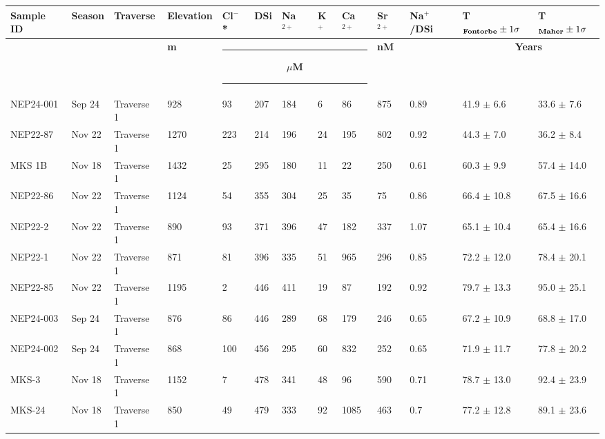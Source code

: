 \begin{landscape}
{\begin{longtable}{l l l l l l l l l l l l l}
    \hline
    \textbf{Sample ID}  &  \textbf{Season}  &  \textbf{Traverse}  &  \textbf{Elevation}  &  \textbf{Cl$^-$*}  &  \textbf{DSi}  &  \textbf{Na$^{2+}$}  &  \textbf{K$^{+}$}  &  \textbf{Ca$^{2+}$}  &  \textbf{Sr$^{2+}$}  &  \textbf{Na$^{+}$/DSi}  & \textbf{T$_{\text{\textbf{Fontorbe}}} \pm 1\sigma$ }  &  \textbf{T$_{\text{\textbf{Maher}}} \pm 1\sigma$} \\
    \hline
      &   &   &  \textbf{m}  &  \multicolumn{5}{c}{\hspace{-0.35cm}\rule{2.5cm}{0.8pt} \hspace{0.3cm}\textbf{ $\mu$M } \hspace{0.3cm} \rule{2.5cm}{0.8pt}} & \multicolumn{1}{l}{\textbf{nM}} &  &  \multicolumn{2}{c}{\textbf{Years}} \\
    \hline
    \endhead
    \hline
    \endfoot
    \hline
    NEP24-001 & Sep 24 & Traverse 1 & 928 & 93 & 207 & 184 & 6 & 86 & 875 & 0.89 & 41.9 $\pm$ 6.6 & 33.6 $\pm$ 7.6 \\
    NEP22-87 & Nov 22 & Traverse 1 & 1270 & 223 & 214 & 196 & 24 & 195 & 802 & 0.92 & 44.3 $\pm$ 7.0 & 36.2 $\pm$ 8.4 \\
    MKS 1B & Nov 18 & Traverse 1 & 1432 & 25 & 295 & 180 & 11 & 22 & 250 & 0.61 & 60.3 $\pm$ 9.9 & 57.4 $\pm$ 14.0 \\
    NEP22-86 & Nov 22 & Traverse 1 & 1124 & 54 & 355 & 304 & 25 & 35 & 75 & 0.86 & 66.4 $\pm$ 10.8 & 67.5 $\pm$ 16.6 \\
    NEP22-2 & Nov 22 & Traverse 1 & 890 & 93 & 371 & 396 & 47 & 182 & 337 & 1.07 & 65.1 $\pm$ 10.4 & 65.4 $\pm$ 16.6 \\
    NEP22-1 & Nov 22 & Traverse 1 & 871 & 81 & 396 & 335 & 51 & 965 & 296 & 0.85 & 72.2 $\pm$ 12.0 & 78.4 $\pm$ 20.1 \\
    NEP22-85 & Nov 22 & Traverse 1 & 1195 & 2 & 446 & 411 & 19 & 87 & 192 & 0.92 & 79.7 $\pm$ 13.3 & 95.0 $\pm$ 25.1 \\
    NEP24-003 & Sep 24 & Traverse 1 & 876 & 86 & 446 & 289 & 68 & 179 & 246 & 0.65 & 67.2 $\pm$ 10.9 & 68.8 $\pm$ 17.0 \\
    NEP24-002 & Sep 24 & Traverse 1 & 868 & 100 & 456 & 295 & 60 & 832 & 252 & 0.65 & 71.9 $\pm$ 11.7 & 77.8 $\pm$ 20.2 \\
    MKS-3 & Nov 18 & Traverse 1 & 1152 & 7 & 478 & 341 & 48 & 96 & 590 & 0.71 & 78.7 $\pm$ 13.0 & 92.4 $\pm$ 23.9 \\
    MKS-24 & Nov 18 & Traverse 1 & 850 & 49 & 479 & 333 & 92 & 1085 & 463 & 0.7 & 77.2 $\pm$ 12.8 & 89.1 $\pm$ 23.6 \\

\end{longtable}}
\end{landscape}
